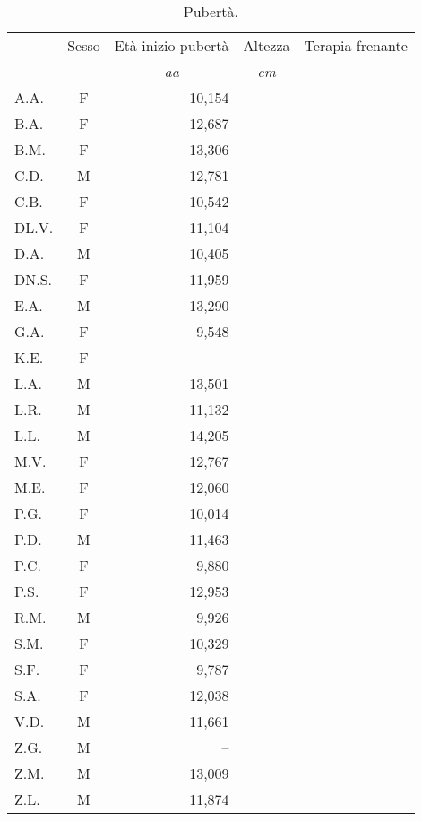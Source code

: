 \begin{table}[!h]
\begin{center}
\begin{tabular}{lcrlc}
\toprule
 & Sesso 	& Età inizio pubertà	& Altezza	& Terapia frenante \\
 & &  \multicolumn{1}{c}{\emph{aa}} 	& \multicolumn{1}{c}{\emph{cm}}			\\
\midrule
A.A.	& F 	& 10,154 		&    		& \checkmark \\
B.A.	& F 	& 12,687 		&    		&            \\
B.M.	& F 	& 13,306 		&    		&            \\
C.D.	& M 	& 12,781 		&    		&            \\
C.B.	& F 	& 10,542 		&    		& \checkmark \\
DL.V.	& F 	& 11,104 		&    		&            \\
D.A.	& M 	& 10,405 		&    		&            \\
DN.S.	& F 	& 11,959 		&    		&            \\
E.A.	& M 	& 13,290 		&    		&            \\
G.A.	& F 	& 9,548  		&    		&            \\
K.E.	& F 	&        		&    		&            \\
L.A.	& M 	& 13,501 		&    		&            \\
L.R.	& M 	& 11,132 		&    		&            \\
L.L.	& M 	& 14,205 		&    		&            \\
M.V.	& F 	& 12,767 		&    		&            \\
M.E.	& F 	& 12,060 		&    		&            \\
P.G.	& F 	& 10,014 		&    		& \checkmark \\
P.D.	& M 	& 11,463 		&    		&            \\
P.C.	& F 	& 9,880  		&    		&            \\
P.S.	& F 	& 12,953 		&    		&            \\
R.M.	& M 	& 9,926  		&    		&            \\
S.M.	& F 	& 10,329 		&    		& \checkmark \\
S.F.	& F 	& 9,787  		&    		&            \\
S.A.	& F 	& 12,038 		&    		&            \\
V.D.	& M 	& 11,661 		&    		&            \\
Z.G.	& M 	&   --   		&    		&            \\
Z.M.	& M 	& 13,009 		&    		&            \\
Z.L.	& M 	& 11,874 		&    		&            \\
\bottomrule
\end{tabular}
\end{center}
\caption{Pubertà.}
\label{tab:Puberta}
\end{table}


